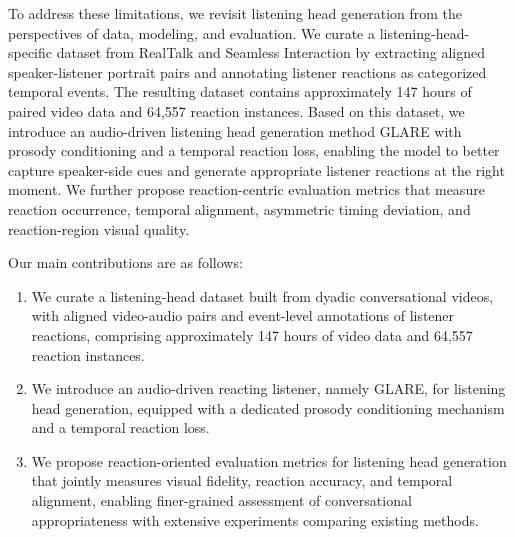 To address these limitations, we revisit listening head generation from the perspectives of data, modeling, and evaluation. We curate a listening-head-specific dataset from RealTalk and Seamless Interaction by extracting aligned speaker-listener portrait pairs and annotating listener reactions as categorized temporal events. The resulting dataset contains approximately 147 hours of paired video data and 64,557 reaction instances. Based on this dataset, we introduce an audio-driven listening head generation method GLARE with prosody conditioning and a temporal reaction loss, enabling the model to better capture speaker-side cues and generate appropriate listener reactions at the right moment. We further propose reaction-centric evaluation metrics that measure reaction occurrence, temporal alignment, asymmetric timing deviation, and reaction-region visual quality.

Our main contributions are as follows:

\begin{enumerate}[leftmargin=1.5em, itemsep=0em, topsep=0em]
    \item We curate a listening-head dataset built from dyadic conversational videos, with aligned video-audio pairs and event-level annotations of listener reactions, comprising approximately 147 hours of video data and 64,557 reaction instances.
    \item We introduce an audio-driven reacting listener, namely GLARE, for listening head generation, equipped with a dedicated prosody conditioning mechanism and a temporal reaction loss.
    \item We propose reaction-oriented evaluation metrics for listening head generation that jointly measures visual fidelity, reaction accuracy, and temporal alignment, enabling finer-grained assessment of conversational appropriateness with extensive experiments comparing existing methods.
\end{enumerate}